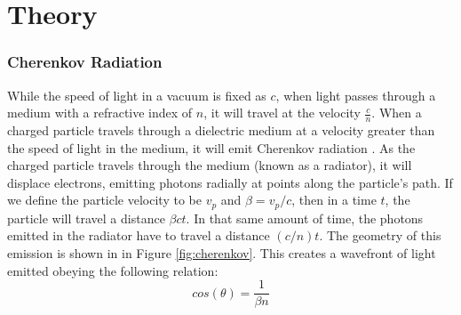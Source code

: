 
\chapter{Theory}
\label{ch:Theory}

\subsection{Cherenkov Radiation}
While the speed of light in a vacuum is fixed as $c$, when light passes through a medium with a refractive index of $n$, it will travel at the velocity $\frac{c}{n}$. When a charged particle travels through a dielectric medium at a velocity greater than the speed of light in the medium, it will emit Cherenkov radiation \cite{cherenkov}. As the charged particle travels through the medium (known as a radiator), it will displace electrons, emitting photons radially at points along the particle's path. If we define the particle velocity to be $v_p$ and $\beta = v_p / c$, then in a time $t$, the particle will travel a distance $\beta ct$. In that same amount of time, the photons emitted in the radiator have to travel a distance $(c/n)t$. The geometry of this emission is shown in in Figure \ref{fig:cherenkov}. This creates a wavefront of light emitted obeying the following relation:
\begin{equation}
    cos(\theta) = \frac{1}{\beta n}
    \label{eq:cherenkovAngle}
\end{equation}

